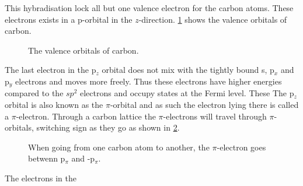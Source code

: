 This hybradisation lock all but one valence electron for the carbon atoms. These electrons exists in a p-orbital in the \(z\)-direction.
\cref{p} shows the valence orbitals of carbon.
\begin{figure}[H]
	\begin{center}
		\caption{The valence orbitals of carbon.}
		\label{p}
	\end{center}
\end{figure}
The last electron in the p\(_z\) orbital does not mix with the tightly bound s, p\(_x\) and p\(_y\) electrons and moves more freely. Thus these electrons have higher energies compared to the \(sp^2\) electrons and occupy states at the Fermi level. These The p\(_z\) orbital is also known as the \(\pi\)-orbital and as such the electron lying there is called a \(\pi\)-electron. Through a carbon lattice the \(\pi\)-electrons will travel through \(\pi\)-orbitals, switching sign as they go as shown in \cref{sign}.
\begin{figure}[H]
	\begin{center}
		\caption{When going from one carbon atom to another, the \(\pi\)-electron goes betwenn p\(_\pi\) and -p\(_\pi\).}
		\label{sign}
	\end{center}
\end{figure}
\cite{calogero_electron_2019}
The electrons in the 